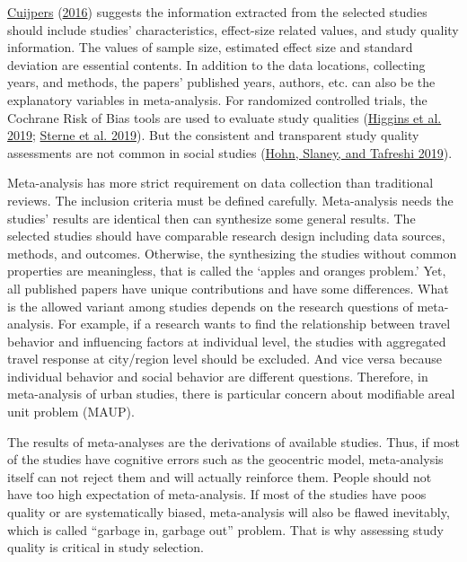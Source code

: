\documentclass[
  11pt,
  openany]{memoir}
\begin{document}
\protect\hyperlink{ref-cuijpersMetaanalysesMentalHealth2016}{Cuijpers} (\protect\hyperlink{ref-cuijpersMetaanalysesMentalHealth2016}{2016}) suggests the information extracted from the selected studies should include studies' characteristics, effect-size related values, and study quality information.
The values of sample size, estimated effect size and standard deviation are essential contents.
In addition to the data locations, collecting years, and methods, the papers' published years, authors, etc. can also be the explanatory variables in meta-analysis.
For randomized controlled trials, the Cochrane Risk of Bias tools are used to evaluate study qualities (\protect\hyperlink{ref-higginsCochraneHandbookSystematic2019}{Higgins et al. 2019}; \protect\hyperlink{ref-sterneRoBRevisedTool2019}{Sterne et al. 2019}).
But the consistent and transparent study quality assessments are not common in social studies (\protect\hyperlink{ref-hohnPrimaryStudyQuality2019}{Hohn, Slaney, and Tafreshi 2019}).

Meta-analysis has more strict requirement on data collection than traditional reviews.
The inclusion criteria must be defined carefully.
Meta-analysis needs the studies' results are identical then can synthesize some general results.
The selected studies should have comparable research design including data sources, methods, and outcomes.
Otherwise, the synthesizing the studies without common properties are meaningless, that is called the `apples and oranges problem.'
Yet, all published papers have unique contributions and have some differences.
What is the allowed variant among studies depends on the research questions of meta-analysis.
For example, if a research wants to find the relationship between travel behavior and influencing factors at individual level, the studies with aggregated travel response at city/region level should be excluded.
And vice versa because individual behavior and social behavior are different questions.
Therefore, in meta-analysis of urban studies, there is particular concern about modifiable areal unit problem (MAUP).

The results of meta-analyses are the derivations of available studies.
Thus, if most of the studies have cognitive errors such as the geocentric model, meta-analysis itself can not reject them and will actually reinforce them.
People should not have too high expectation of meta-analysis.
If most of the studies have poos quality or are systematically biased, meta-analysis will also be flawed inevitably, which is called ``garbage in, garbage out'' problem.
That is why assessing study quality is critical in study selection.
\end{document}
